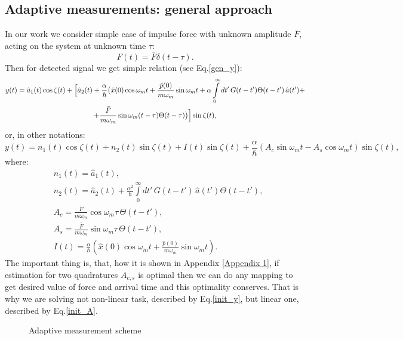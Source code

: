 \subsection{Adaptive measurements: general approach}
In our work we consider simple case of impulse force with unknown amplitude $\bar{F}$, acting on the system at unknown time $\tau$: 
\begin{equation}
 F(t)=\bar{F}\delta(t-\tau).
\end{equation}
Then for detected signal we get simple relation (see Eq.\ref{gen_y}):
\begin{multline}\label{init_y}
 y(t)=\hat{a}_1(t)\cos \zeta(t)+\Bigl[\hat{a}_2(t)+\frac{\alpha}{\hbar}\bigl(\hat{x}(0) \cos \omega_m t+ \frac{\hat{p}(0)}{m \omega_m} \sin \omega_m t + \alpha \int\limits_0^{\infty} dt' \, G(t-t') \Theta(t-t')\, \hat{a}(t') +\\+ \frac{\bar{F}}{m\omega_m}\sin\omega_m(t-\tau)\Theta(t-\tau)\bigr)\Bigr]\sin\zeta(t),
\end{multline}
or, in other notations:
\begin{equation}\label{init_A}
 y(t)=n_1(t)\cos\zeta(t)+  n_2(t)\sin\zeta(t) + I(t) \sin\zeta(t) + \frac{\alpha}{\hbar}(A_c\sin\omega_mt - A_s\cos\omega_mt)\sin\zeta(t),
\end{equation}
where:
\begin{align}
& n_1(t)=\hat{a}_1(t),\\
& n_2(t)=\hat{a}_2(t)+\frac{\alpha^2}{\hbar}\int\limits_0^{\infty} dt' \, G(t-t') \, \hat{a}(t') \Theta(t-t'),\\
& A_c = \frac{\bar{F}}{m\omega_m}\cos\omega_m\tau\,\Theta(t-t'),\\
& A_s = \frac{\bar{F}}{m\omega_m}\sin\omega_m\tau\,\Theta(t-t'),\\
& I(t) = \frac{\alpha}{\hbar}(\hat{x}(0) \cos \omega_m t+ \frac{\hat{p}(0)}{m \omega_m} \sin \omega_m t).
\end{align}
The important thing is, that, how it is shown in Appendix \ref{Appendix 1}, if estimation for two quadratures $A_{c,s}$ is optimal then we can do any mapping to get desired value of force and arrival time and this optimality conserves.
That is why we are solving not non-linear task, described by Eq.\ref{init_y}, but linear one, described by Eq.\ref{init_A}. 
\begin{figure}[t]
\caption{Adaptive measurement scheme}
\label{pic:adaptive_process}
\end{figure}


